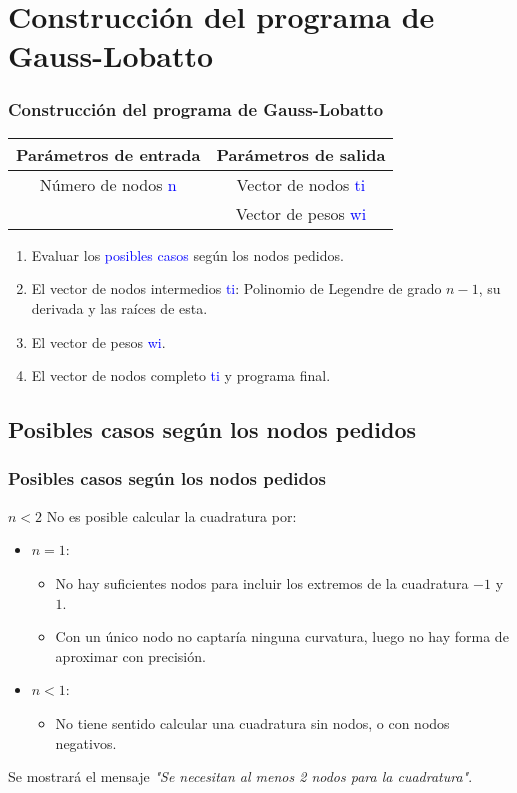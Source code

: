 \documentclass{beamer}
\begin{document}
\section{Construcción del programa de Gauss-Lobatto}
\begin{frame}
\frametitle{Construcción del programa de Gauss-Lobatto}

\begin{table}
    \centering
    \begin{tabular}{cc}
    \toprule
   \textbf{ Parámetros de entrada} & \textbf{Parámetros de salida} \\
   \midrule
    Número de nodos \textcolor{blue}{n} & Vector de nodos \textcolor{blue}{ti}\\
         & Vector de pesos \textcolor{blue}{wi}\\
    \bottomrule
    \end{tabular}

    \label{tab:my_label}
\end{table}
\begin{enumerate}
\item Evaluar los \textcolor{blue}{posibles casos} según los nodos pedidos.
\item El vector de nodos intermedios \textcolor{blue}{ti}: Polinomio de Legendre de grado $n-1$, su derivada y las raíces de esta.
\item El vector de pesos \textcolor{blue}{wi}.
\item El vector de nodos completo \textcolor{blue}{ti} y programa final.
\end{enumerate}
\end{frame}

\subsection{Posibles casos según los nodos pedidos}
\begin{frame}
\frametitle{Posibles casos según los nodos pedidos}
\begin{block}{$n<2$}
No es posible calcular  la cuadratura por:
\begin{itemize}
    \item $n=1$:
    \begin{itemize}
        \item No hay suficientes nodos para incluir los extremos de la cuadratura $−1$ y $1$.
        \item Con un único nodo no captaría ninguna curvatura, luego no hay forma de aproximar con precisión.
    \end{itemize}
    \item $n<1$: 
    \begin{itemize}
        \item No tiene sentido calcular una cuadratura sin nodos, o con nodos negativos.
    \end{itemize}
\end{itemize}
Se mostrará el mensaje \textit{"Se necesitan al menos 2 nodos para la cuadratura"}.
\end{block}

\end{frame}
\end{document}
